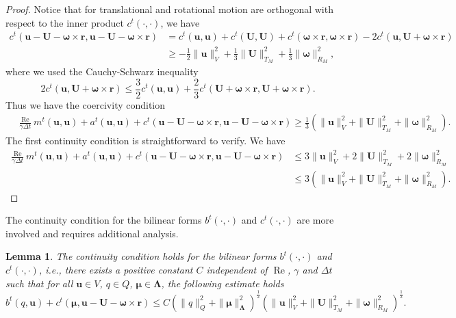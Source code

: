 \documentclass{article}
\newcommand{\bU}{{\mathbf{U}}}
\newcommand{\bu}{{\mathbf{u}}}
\newcommand{\bomega}{{\boldsymbol{\omega}}}
\newcommand{\Reynolds}{{\operatorname{Re}}}
\newtheorem{lemma}[theorem]{Lemma}
\begin{document}
\begin{proof}
    Notice that for translational and rotational motion are orthogonal with respect to the inner product $c^t(\cdot,\cdot)$, we have
\begin{equation}
    \begin{aligned}
        {c}^t(\bu-{\bU} - {\bomega}\times\mathbf{r},\bu-{\bU} - {\bomega}\times\mathbf{r}) &= {c}^t(\bu,\bu) + {c}^t({\bU},{\bU}) + {c}^t({\bomega}\times\mathbf{r},{\bomega}\times\mathbf{r}) - 2{c}^t(\bu,{\bU} + {\bomega}\times\mathbf{r})\\
        &\geq -\frac{1}{2}\|\bu\|_V^2 + \frac13\|{\bU}\|_{T_M}^2 + \frac{1}{3}\|{\bomega}\|_{R_M}^2,
    \end{aligned}
\end{equation}
where we used the Cauchy-Schwarz inequality
\begin{equation}
    2{c}^t(\bu,{\bU} + {\bomega}\times\mathbf{r})\leq\frac32 {c}^t(\bu,\bu) + \frac23 {c}^t({\bU} + {\bomega}\times\mathbf{r},{\bU} + {\bomega}\times\mathbf{r}).
\end{equation}
Thus we have the coercivity condition
\begin{equation}
    \begin{aligned}
        &\frac{\Reynolds}{\gamma\Delta t}{m}^t(\bu,\bu) + {a}^t(\bu,\bu) +  {c}^t(\bu-{\bU} - {\bomega}\times\mathbf{r},\bu-{\bU} - {\bomega}\times\mathbf{r})\geq \frac13 (\|\bu\|^2_V  + \|\bU\|_{T_M}^2 + \|\bomega\|_{R_M}^2).
    \end{aligned}
\end{equation}
The first continuity condition is straightforward to verify. We have
\begin{equation}
    \begin{aligned}
        \frac{\Reynolds}{\gamma\Delta t}{m}^t(\bu,\bu) + {a}^t(\bu,\bu) +  {c}^t(\bu-{\bU} - {\bomega}\times\mathbf{r},\bu-{\bU} - {\bomega}\times\mathbf{r})
        &\leq 3\|\bu\|^2_V + 2\|\bU\|_{T_M}^2 + 2\|\bomega\|_{R_M}^2 \\
        &\leq 3 \left( \|\bu\|^2_V + \|\bU\|_{T_M}^2 + \|\bomega\|_{R_M}^2 \right).
    \end{aligned}
\end{equation}
\end{proof}
The continuity condition for the bilinear forms $b^t(\cdot,\cdot)$ and $c^t(\cdot,\cdot)$ are more involved and requires additional analysis.
\begin{lemma}
    The continuity condition holds for the bilinear forms $b^t(\cdot,\cdot)$ and $c^t(\cdot,\cdot)$, i.e., there exists a positive constant $C$ independent of $\Reynolds$, $\gamma$ and $\Delta t$ such that for all $\bu\in V$, ${q}\in Q$, ${\boldsymbol{\mu}}\in\boldsymbol{\Lambda}$, the following estimate holds
    \begin{equation}
        {b}^t({q},\bu)+{c}^t({\boldsymbol{\mu}},\bu - {\bU} - {\bomega}\times\mathbf{r})\leq C(\|{q}\|_Q^2+\|{\boldsymbol{\mu}}\|_{\boldsymbol{\Lambda}}^2)^\frac12 (\|\bu\|_V^2 + \|{\bU}\|_{T_M}^2 + \|{\bomega}\|_{R_M}^2)^\frac12.
    \end{equation}
\end{lemma}
\end{document}
